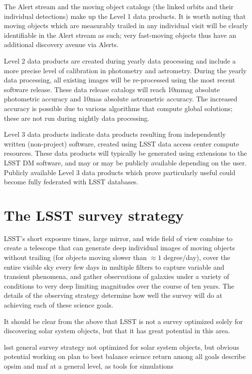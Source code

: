\documentclass{iau}
\begin{document}
The Alert stream and the moving object catalogs (the linked orbits and
their individual detections) make up the Level 1 data products. It is
worth noting that moving objects which are measurably trailed in any
individual visit will be clearly identifiable in the Alert stream as
such; very fast-moving objects thus have an additional discovery
avenue via Alerts.

Level 2 data products are created during yearly data processing and
include a more precise level of calibration in photometry and
astrometry. During the yearly data processing, all existing images
will be re-processed using the most recent software release. These
data release catalogs will reach 10mmag absolute photometric accuracy
and 10mas absolute astrometric accuracy. The increased accuracy is
possible due to various algorithms that compute global solutions;
these are not run during nightly data processing.

Level 3 data products indicate data products resulting from
independently written (non-project) software, created using LSST data
access center compute resources. These data products will typically be
generated using extensions to the LSST DM software, and may or may be
publicly available depending on the user. Publicly available Level 3
data products which prove particularly useful could become fully
federated with LSST databases.

\section{The LSST survey strategy}

LSST's short exposure times, large mirror, and wide field of view combine
to create a telescope that can generate deep individual images of
moving objects without trailing (for objects moving slower than
$\approx1$ degree/day), cover the entire visible sky every few days in
multiple filters to capture variable and transient phenomena, and
gather observations of galaxies under a variety of conditions to very
deep limiting magnitudes over the course of ten years. The details of
the observing strategy determine how well the survey will do at
achieving each of these science goals.

It should be clear from the above that LSST is not a survey optimized
solely for discovering solar system objects, but that it has great
potential in this area.

lsst general survey strategy
not optimized for solar system objects, but obvious potential
working on plan to best balance science return among all goals
describe opsim and maf at a general level, as tools for simulations
\end{document}
